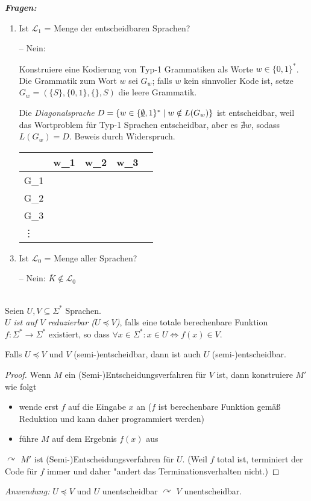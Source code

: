 \emph{\textbf{Fragen:}}
\begin{enumerate}
	\item Ist $\mathcal{L}_1$ = Menge der entscheidbaren Sprachen?
	\item[--] Nein:\\
	\begin{minipage}[t]{.7\linewidth}
	Konstruiere eine Kodierung von Typ-1 Grammatiken als Worte
        $w\in\{0,1\}^*$. Die Grammatik zum Wort $w$ sei $G_w$; falls
        $w$ kein sinnvoller Kode ist, setze $G_w = (\{S\}, \{0,1\},
        \{\}, S)$ die leere Grammatik.
        
	Die \emph{Diagonalsprache} $D = \{w \in\{\underline{\smash{\emptyset}},1\}^* \mid w\notin
        L(G_w)\}$ ist entscheidbar, weil das Wortproblem für Typ-1  
	Sprachen entscheidbar, aber es $\nexists w$, sodass $L(G_w) =
        D$. Beweis durch Widerspruch.
	\end{minipage}\quad
	\begin{tabular}[t]{M{c} | *4{M{c}@{ }}}
		\ &w_1&w_2&w_3&\cdots\\\hline
		G_1 &\\
		G_2 &\\
		G_3 &\\
		\vdots&
	\end{tabular}
	\item Ist $\mathcal{L}_0$ = Menge aller Sprachen?
	\item[--] Nein: $\overline{K} \notin \mathcal{L}_0$
\end{enumerate}
\begin{Def}[Reduktion]\ \\
  Seien $U, V \subseteq \Sigma^*$ Sprachen.\\
  \emph{$U$ ist auf $V$ reduzierbar ($U \preceq V$)}, falls eine totale berechenbare Funktion
  $f:\Sigma^* \to \Sigma^*$ existiert, so dass $\forall x \in \Sigma^*:x \in U \iff f(x) \in V$.
\end{Def}
\begin{lemma}
  Falls $U \preceq V$ und $V$ \mbox{(semi-)entscheidbar}, dann ist auch $U$
  \mbox{(semi-)entscheidbar}.
\end{lemma}\vspace{-1.5em}
\begin{proof}
  Wenn $M$ ein (Semi-)Entscheidungsverfahren für $V$ ist, dann konstruiere $M'$ wie folgt
  \begin{itemize}
  \item wende erst $f$ auf die Eingabe $x$ an ($f$ ist berechenbare
    Funktion gemäß Reduktion und kann daher programmiert werden)
  \item führe $M$ auf dem Ergebnis $f(x)$ aus
  \end{itemize}
  $\curvearrowright$ $M'$ ist (Semi-)Entscheidungsverfahren für
  $U$. (Weil $f$ total ist, terminiert der Code  für $f$ immer und daher "andert das Terminationsverhalten nicht.)
\end{proof}
\emph{Anwendung:} $U \preceq V$ und $U$
unentscheidbar $\curvearrowright$ $V$ unentscheidbar.

